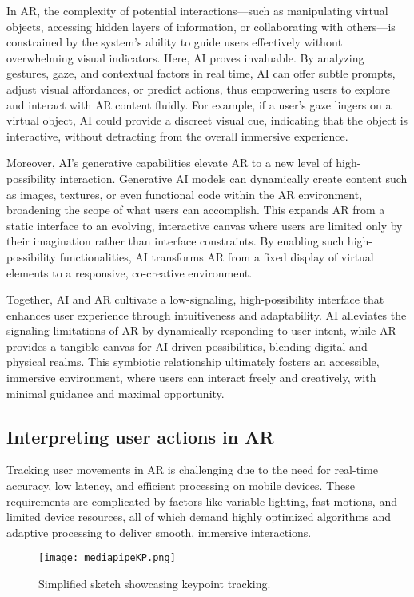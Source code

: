 In AR, the complexity of potential interactions—such as manipulating virtual objects, accessing hidden layers of information, or collaborating with others—is constrained by the system's ability to guide users effectively without overwhelming visual indicators.
Here, AI proves invaluable.
By analyzing gestures, gaze, and contextual factors in real time, AI can offer subtle prompts, adjust visual affordances, or predict actions, thus empowering users to explore and interact with AR content fluidly.
For example, if a user’s gaze lingers on a virtual object, AI could provide a discreet visual cue, indicating that the object is interactive, without detracting from the overall immersive experience.

Moreover, AI's generative capabilities elevate AR to a new level of high-possibility interaction.
Generative AI models can dynamically create content such as images, textures, or even functional code within the AR environment, broadening the scope of what users can accomplish.
This expands AR from a static interface to an evolving, interactive canvas where users are limited only by their imagination rather than interface constraints.
By enabling such high-possibility functionalities, AI transforms AR from a fixed display of virtual elements to a responsive, co-creative environment.

Together, AI and AR cultivate a low-signaling, high-possibility interface that enhances user experience through intuitiveness and adaptability.
AI alleviates the signaling limitations of AR by dynamically responding to user intent, while AR provides a tangible canvas for AI-driven possibilities, blending digital and physical realms.
This symbiotic relationship ultimately fosters an accessible, immersive environment, where users can interact freely and creatively, with minimal guidance and maximal opportunity.


\subsection{ Interpreting user actions in AR}


Tracking user movements in AR is challenging due to the need for real-time accuracy, low latency, and efficient processing on mobile devices.
These requirements are complicated by factors like variable lighting, fast motions, and limited device resources, all of which demand highly optimized algorithms and adaptive processing to deliver smooth, immersive interactions.

\begin{figure}[h]
    \centering
    \texttt{[image: mediapipeKP.png]}
    \caption{Simplified sketch showcasing keypoint tracking.}
    \vspace{0.1cm}
    \label{fig:kptracking}
\end{figure}

